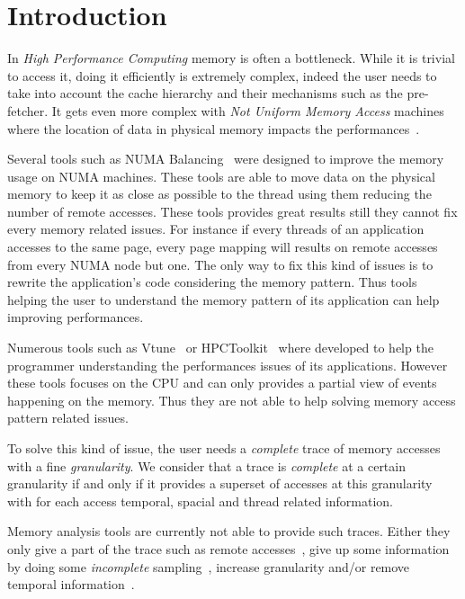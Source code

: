 \section{Introduction}
\label{sec:intro}

In \emph{High Performance Computing} memory is often a bottleneck.
While it is trivial to access it, doing it efficiently is extremely
complex, indeed the user needs to take into account the cache hierarchy and
their mechanisms such as the pre-fetcher. It gets even more complex with
\emph{Not Uniform Memory Access} machines where the location of data in
physical memory impacts the performances~\cite{Drepper07What}.

Several tools such as NUMA Balancing~\cite{Corbet2012} were designed to improve the
memory usage on NUMA machines. These tools are able to move data on the
physical memory to keep it as close as possible to the thread using them
reducing the number of remote accesses. These tools provides great results
still they cannot fix every memory related issues. For instance if every
threads of an application accesses to the same page, every page mapping will
results on remote accesses from every NUMA node but one. The only way to fix
this kind of issues is to rewrite the application's code considering the
memory pattern. Thus tools helping the user to understand the memory pattern
of its application can help improving performances.

Numerous tools such as Vtune~\cite{Reinders05VTune} or
HPCToolkit~\cite{Adhianto10HPCTOOLKIT} where developed to help the programmer
understanding the performances issues of its applications. However these tools
focuses on the CPU and can only provides a partial view of events happening on
the memory. Thus they are not able to help solving memory access pattern
related issues.

To solve this kind of issue, the user needs a \emph{complete} trace of memory
accesses with a fine \emph{granularity}. We consider that a trace is
\emph{complete} at a certain granularity if and only if it provides a superset
of accesses at this granularity with for each access temporal, spacial and
thread related information.

Memory analysis tools are currently not able to provide such traces. Either
they only give a part of the trace such as
remote accesses~\cite{Lachaize12MemProf}, give up some information by
doing some \emph{incomplete} sampling~\cite{Liu14Tool}, increase granularity
and/or remove temporal information~\cite{Beniamine15TABARNACRR}.

